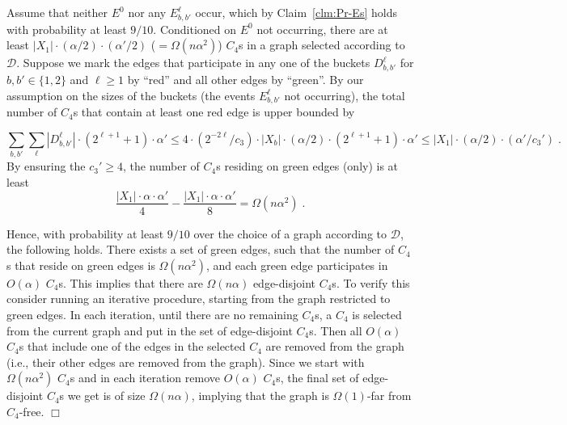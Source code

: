 \documentclass{article}
\newcommand{\calD}{{\mathcal{D}}}
\newenvironment{proofof}[1]{\smallskip\noindent{\bf Proof of #1:}}%
        {\hspace*{\fill}$\Box$\par}
\newcommand{\ForFuture}[1]{}
\begin{document}
\medskip
\begin{proofof}{Lemma~\ref{lem:D-C4-far}}
Assume that neither $E^0$ nor any $E_{b,b'}^\ell$ occur, which by Claim~\ref{clm:Pr-Es} holds with probability at least  $9/10$. Conditioned on $E^0$ not occurring, there are at least  $|X_1|\cdot (\alpha/2)\cdot (\alpha'/2)$ ($ = \Omega(n\alpha^2)$) $C_4$s in a graph selected according to $\mathcal{D}$.
Suppose we mark the edges that participate in any one of the buckets $D_{b,b'}^\ell$ for $b,b'\in \{1,2\}$ and $\ell\geq 1$ by ``red'' and all other edges by ``green''.
By our assumption on the sizes of the buckets (the events $E_{b,b'}^\ell$ not occurring), the total number of $C_4$s that contain at least one red edge is upper bounded by
\ForFuture{ D: verify constants etc.}
\begin{equation}
\sum_{b,b'}\sum_\ell |D_{b,b'}^\ell|\cdot (2^{\ell+1}+1)\cdot \alpha' \leq
  4 \cdot (2^{-2\ell}/c_3)\cdot |X_b|\cdot (\alpha/2) \cdot (2^{\ell+1} +1)\cdot \alpha' \leq   |X_1|\cdot(\alpha/2)\cdot (\alpha'/c_3') %
  \;.
\end{equation}
By ensuring the $c_3' \geq 4$,
the number of $C_4$s residing  on green edges (only) is at least
\begin{equation}
\frac{|X_1|\cdot\alpha\cdot\alpha'}{4}
- \frac{|X_1|\cdot\alpha\cdot\alpha'}{8} =
\Omega(n \alpha^2)\;.
\end{equation}

Hence, with probability at least $9/10$ over the choice of a graph according to $\calD$, the following holds. There exists a set of green edges,  such that the number of $C_4$s that reside  on green edges is $\Omega(n\alpha^2)$, and each green edge participates in  $O(\alpha)$ $C_4$s. This implies that there are $\Omega(n\alpha)$ edge-disjoint $C_4$s. To verify this consider running an iterative procedure, starting from the graph restricted to green edges. In each iteration, until there are no remaining $C_4$s, a $C_4$ is selected from the current graph and put in the set of edge-disjoint $C_4$s. Then all $O(\alpha)$ $C_4$s that include one of the edges in the selected $C_4$ are removed from the graph (i.e., their other edges are removed from the graph). Since we start with $\Omega(n\alpha^2)$ $C_4$s and in each iteration remove $O(\alpha)$ $C_4$s, the final set of edge-disjoint $C_4$s we get is of size $\Omega(n\alpha)$, implying that the graph is $\Omega(1)$-far from $C_4$-free.
\end{proofof}
\end{document}
